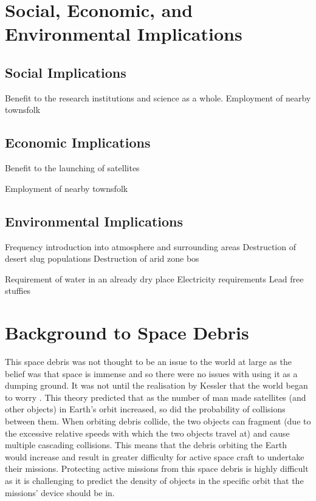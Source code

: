 \documentclass[11pt]{witseiepaper}
\begin{document}
\newpage
\onecolumn
{}
\setcounter{page}{1}
\setcounter{figure}{0} 
\renewcommand{\thefigure}
{A\arabic{figure}}

\onecolumn
\begin{bibunit}[witseie]
\appendix



\section{Social, Economic, and Environmental Implications}

\subsection{Social Implications} \label{sec:SocialImplications}
Benefit to the research institutions and science as a whole.
Employment of nearby townsfolk


\subsection{Economic Implications} \label{sec:EconomicImplications}
Benefit to the launching of satellites

Employment of nearby townsfolk


\subsection{Environmental Implications} \label{sec:EnvironmentalImplications}
Frequency introduction into atmosphere and surrounding areas
Destruction of desert slug populations
Destruction of arid zone bos

Requirement of water in an already dry place
Electricity requirements
Lead free stuffies



\section{Background to Space Debris} \label{sec:BackgroundToSpaceDebris}

This space debris was not thought to be an issue to the world at large as the belief was that space is immense and so there were no issues with using it as a dumping ground. It was not until the realisation by Kessler that the world began to worry \cite{Kessler}. This theory predicted that as the number of man made satellites (and other objects) in Earth's orbit increased, so did the probability of collisions between them. When orbiting debris collide, the two objects can fragment (due to the excessive relative speeds with which the two objects travel at) and cause multiple cascading collisions. This means that the debris orbiting the Earth would increase and result in greater difficulty for active space craft to undertake their missions.
Protecting active missions from this space debris is highly difficult as it is challenging to predict the density of objects in the specific orbit that the missions' device should be in.


\end{bibunit}
\end{document}
